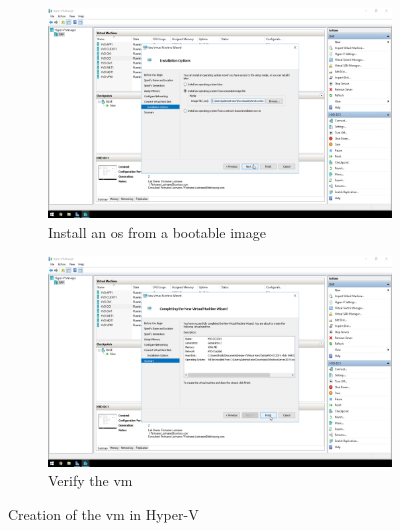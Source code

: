 \begin{figure}[!htb]\ContinuedFloat
	\begin{subfigure}{0.5\textwidth}
		\captionsetup{width=0.8\linewidth}
		\includegraphics[width=0.9\linewidth]{img/Methodologie/Migration2.png}
		\centering
		\caption{Install an \acrshort{os} from a bootable image}
	\end{subfigure}
	\begin{subfigure}{0.5\textwidth}
		\captionsetup{width=0.8\linewidth}
		\includegraphics[width=0.9\linewidth]{img/Methodologie/Migration3.png} 
		\centering	
		\caption{Verify the \acrshort{vm}}
	\end{subfigure}
	\caption[\acrshort{vm} creation]{Creation of the \acrshort{vm} in Hyper-V}
	\label{fig:VMCreation}
\end{figure}
